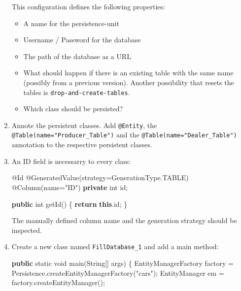 \documentclass[]{report}
\newenvironment{Shaded}{}{}
\newcommand{\KeywordTok}[1]{\textcolor[rgb]{0.00,0.44,0.13}{\textbf{{#1}}}}
\newcommand{\DataTypeTok}[1]{\textcolor[rgb]{0.56,0.13,0.00}{{#1}}}
\newcommand{\StringTok}[1]{\textcolor[rgb]{0.25,0.44,0.63}{{#1}}}
\newcommand{\FunctionTok}[1]{\textcolor[rgb]{0.02,0.16,0.49}{{#1}}}
\newcommand{\NormalTok}[1]{{#1}}
\begin{document}
\begin{enumerate}
  This configuration defines the following properties:

  \begin{itemize}
  \itemsep1pt\parskip0pt
  \item
    A name for the persistence-unit
  \item
    Username / Password for the database
  \item
    The path of the database as a URL
  \item
    What should happen if there is an existing table with the same name
    (possibly from a previous version). Another possibility that resets
    the tables is \texttt{drop-and-create-tables}.
  \item
    Which class should be persisted?
  \end{itemize}
\item
  Annote the persistent classes. Add \texttt{@Entity}, the
  \texttt{@Table(name="Producer\_Table")} and the
  \texttt{@Table(name="Dealer\_Table")} annotation to the respective
  persistent classes.
\item
  An ID field is necessarry to every class:

\begin{Shaded}
\begin{Highlighting}[]
\FunctionTok{@Id}
\FunctionTok{@GeneratedValue}\NormalTok{(strategy=GenerationType.}\FunctionTok{TABLE}\NormalTok{)}
\FunctionTok{@Column}\NormalTok{(name=}\StringTok{"ID"}\NormalTok{)}
\KeywordTok{private} \DataTypeTok{int} \NormalTok{id;}

\KeywordTok{public} \DataTypeTok{int} \FunctionTok{getId}\NormalTok{() \{}
    \KeywordTok{return} \KeywordTok{this}\NormalTok{.}\FunctionTok{id}\NormalTok{;}
\NormalTok{\}}
\end{Highlighting}
\end{Shaded}

  The manually defined column name and the generation strategy should be
  inspected.
\item
  Create a new class named \texttt{FillDatabase\_1} and add a main
  method:

\begin{Shaded}
\begin{Highlighting}[]
\KeywordTok{public} \DataTypeTok{static} \DataTypeTok{void} \FunctionTok{main}\NormalTok{(String[] args) \{}
    \NormalTok{EntityManagerFactory factory = Persistence.}\FunctionTok{createEntityManagerFactory}\NormalTok{(}\StringTok{"cars"}\NormalTok{);}
    \NormalTok{EntityManager em = factory.}\FunctionTok{createEntityManager}\NormalTok{();}



\end{Highlighting}
\end{Shaded}
\end{enumerate}
\end{document}

